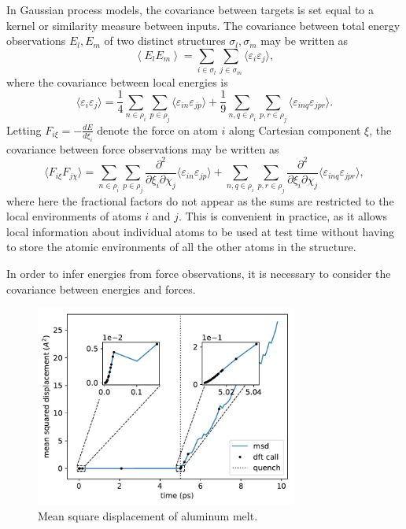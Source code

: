 \documentclass[%
superscriptaddress,
preprint,
amsmath,amssymb,
aps,
prl,
]{revtex4-1}
\begin{document}
In Gaussian process models, the covariance between targets is set equal to a kernel or similarity measure between inputs. The covariance between total energy observations $E_l, E_m$ of two distinct structures $\sigma_l, \sigma_m$ may be written as
\begin{equation}
\left\langle E_l E_m \right\rangle = \sum_{i \in \sigma_l} \sum_{j \in \sigma_m} \langle \varepsilon_i \varepsilon_j \rangle,
\end{equation}
where the covariance between local energies is
\begin{equation}
\langle \varepsilon_i \varepsilon_j \rangle = \frac{1}{4} \sum_{n \in \rho_i} \sum_{p \in \rho_j} \langle \varepsilon_{i n} \varepsilon_{j p} \rangle + \frac{1}{9} \sum_{n, q \in \rho_i} \sum_{p, r \in \rho_j} \langle \varepsilon_{inq} \varepsilon_{jpr} \rangle.
\end{equation}
Letting $F_{i\xi} = - \frac{d E}{d \xi_i}$ denote the force on atom $i$ along Cartesian component $\xi$, the covariance between force observations may be written as
\begin{equation}
  \langle F_{i\xi} F_{j \chi} \rangle =  \sum_{n \in \rho_i} \sum_{p \in \rho_j} \frac{\partial^2}{\partial \xi_i \partial \chi_j} \langle \varepsilon_{i n} \varepsilon_{j p} \rangle +  \sum_{n, q \in \rho_i} \sum_{p, r \in \rho_j} \frac{\partial^2}{\partial \xi_i \partial \chi_j} \langle \varepsilon_{inq} \varepsilon_{jpr} \rangle,
\end{equation}
where here the fractional factors do not appear as the sums are restricted to the local environments of atoms $i$ and $j$. This is convenient in practice, as it allows local information about individual atoms to be used at test time without having to store the atomic environments of all the other atoms in the structure.

In order to infer energies from force observations, it is necessary to consider the covariance between energies and forces.

\newpage

\begin{figure}
	\centering
	\includegraphics[width=3.4in]{melt_msd.pdf}
	\caption{Mean square displacement of aluminum melt.}
\end{figure}
\end{document}
